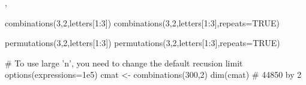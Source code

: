 \begin{SeeAlso}\relax
{}, 
\end{SeeAlso}
\begin{Examples}
\begin{ExampleCode}
combinations(3,2,letters[1:3])
combinations(3,2,letters[1:3],repeats=TRUE)

permutations(3,2,letters[1:3])
permutations(3,2,letters[1:3],repeats=TRUE)

# To use large 'n', you need to change the default recusion limit
options(expressions=1e5)
cmat <- combinations(300,2)
dim(cmat) # 44850 by 2 
\end{ExampleCode}
\end{Examples}

